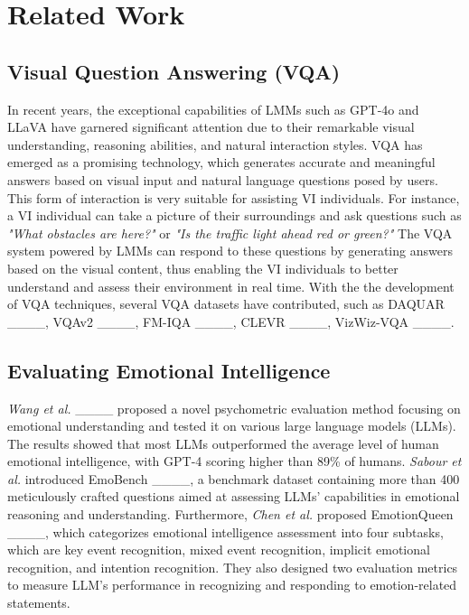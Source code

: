 \section{Related Work}
\subsection{Visual Question Answering (VQA)}
In recent years, the exceptional capabilities of LMMs such as GPT-4o and LLaVA have garnered significant attention due to their remarkable visual understanding, reasoning abilities, and natural interaction styles. VQA has emerged as a promising technology, which generates accurate and meaningful answers based on visual input and natural language questions posed by users. This form of interaction is very suitable for assisting VI individuals. For instance, a VI individual can take a picture of their surroundings and ask questions such as \textit{"What obstacles are here?"} or \textit{"Is the traffic light ahead red or green?"} The VQA system powered by LMMs can respond to these questions by generating answers based on the visual content, thus enabling the VI individuals to better understand and assess their environment in real time. With the the development of VQA techniques, several VQA datasets have contributed, such as DAQUAR ____, VQAv2 ____, FM-IQA ____, CLEVR ____, VizWiz-VQA ____.

\subsection{Evaluating Emotional Intelligence }
\textit{Wang et al.} ____ proposed a novel psychometric evaluation method focusing on emotional understanding and tested it on various large language models (LLMs). The results showed that most LLMs outperformed the average level of human emotional intelligence, with GPT-4 scoring higher than 89\% of humans. \textit{Sabour et al.} introduced EmoBench ____, a benchmark dataset containing more than 400 meticulously crafted questions aimed at assessing LLMs’ capabilities in emotional reasoning and understanding. Furthermore, \textit{Chen et al.} proposed EmotionQueen ____, which categorizes emotional intelligence assessment into four subtasks, which are key event recognition, mixed event recognition, implicit emotional recognition, and intention recognition. They also designed two evaluation metrics to measure LLM's performance in recognizing and responding to emotion-related statements.

